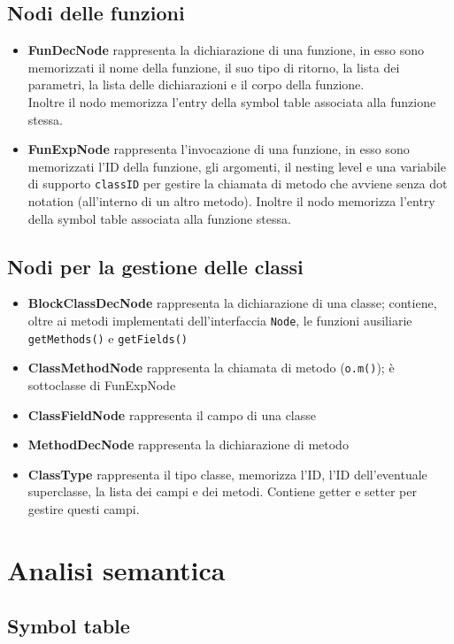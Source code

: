 \documentclass[a4paper]{article}   %
\begin{document}
\subsection{Nodi delle funzioni}
\begin{itemize}
  \item \textbf{FunDecNode} rappresenta la dichiarazione di una funzione, in esso sono memorizzati
  il nome della funzione, il suo tipo di ritorno, la lista dei parametri, la lista delle dichiarazioni e il corpo della funzione.\\
  Inoltre il nodo memorizza l'entry della symbol table associata alla funzione stessa.
  \item \textbf{FunExpNode} rappresenta l'invocazione di una funzione, in esso sono memorizzati l'ID della funzione, gli argomenti, il nesting level e una variabile di supporto \lstinline|classID| per gestire la chiamata di metodo che avviene senza dot notation (all'interno di un altro metodo). Inoltre il nodo memorizza l'entry della symbol table associata alla funzione stessa.
\end{itemize}
\subsection{Nodi per la gestione delle classi}
\begin{itemize}
  \item \textbf{BlockClassDecNode} rappresenta la dichiarazione di una classe; contiene, oltre ai metodi implementati dell'interfaccia \lstinline|Node|, le funzioni ausiliarie \lstinline|getMethods()| e \lstinline|getFields()|
  \item \textbf{ClassMethodNode} rappresenta la chiamata di metodo (\lstinline|o.m()|); è sottoclasse di FunExpNode
  \item \textbf{ClassFieldNode} rappresenta il campo di una classe
  \item \textbf{MethodDecNode} rappresenta la dichiarazione di metodo
  \item \textbf{ClassType} rappresenta il tipo classe, memorizza l'ID, l'ID dell'eventuale superclasse, la lista dei campi e dei metodi. Contiene getter e setter per gestire questi campi.
\end{itemize}

\section{Analisi semantica}
\subsection{Symbol table}
\end{document}
